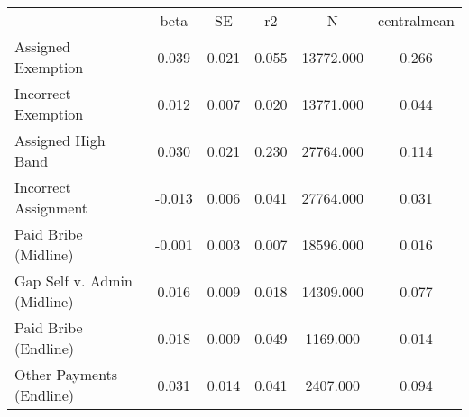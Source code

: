 {\def\sym#1{\ifmmode^{#1}\else\(^{#1}\)\fi} \begin{tabular}{l*{5}{c}} \hline\hline 
& beta & SE & r2 & N & centralmean \\
Assigned Exemption & 0.039 & 0.021 & 0.055 & 13772.000 & 0.266 \\
Incorrect Exemption & 0.012 & 0.007 & 0.020 & 13771.000 & 0.044 \\
Assigned High Band & 0.030 & 0.021 & 0.230 & 27764.000 & 0.114 \\
Incorrect Assignment & -0.013 & 0.006 & 0.041 & 27764.000 & 0.031 \\
Paid Bribe (Midline) & -0.001 & 0.003 & 0.007 & 18596.000 & 0.016 \\
Gap Self v. Admin (Midline) & 0.016 & 0.009 & 0.018 & 14309.000 & 0.077 \\
Paid Bribe (Endline) & 0.018 & 0.009 & 0.049 & 1169.000 & 0.014 \\
Other Payments (Endline) & 0.031 & 0.014 & 0.041 & 2407.000 & 0.094 \\
\hline\hline \end{tabular} }
